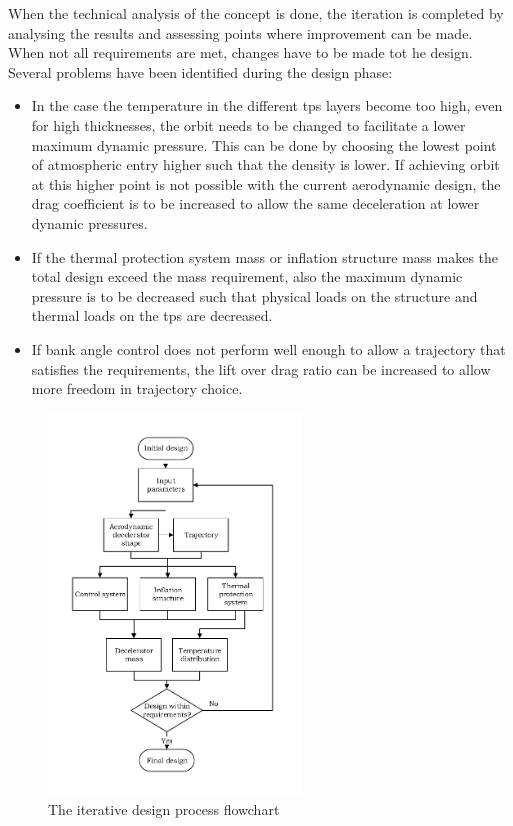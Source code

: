 When the technical analysis of the concept is done, the iteration is completed by analysing the results and assessing points where improvement can be made. When not all requirements are met, changes have to be made tot he design. Several problems have been identified during the design phase:
\begin{itemize}
	\item In the case the temperature in the different \gls{tps} layers become too high, even for high thicknesses, the orbit needs to be changed to facilitate a lower maximum dynamic pressure. This can be done by choosing the lowest point of atmospheric entry higher such that the density is lower. If achieving orbit at this higher point is not possible with the current aerodynamic design, the drag coefficient is to be increased to allow the same deceleration at lower dynamic pressures.
	
	\item If the thermal protection system mass or inflation structure mass makes the total design exceed the mass requirement, also the maximum dynamic pressure is to be decreased such that physical loads on the structure and thermal loads on the \gls{tps} are decreased.
	
	\item If bank angle control does not perform well enough to allow a trajectory that satisfies the requirements, the lift over drag ratio can be increased to allow more freedom in trajectory choice.
	
	
\end{itemize}

\begin{figure}
	\begin{center}
		\includegraphics[width=0.6\textwidth]{./Figure/DesignIterationPhilosophy_new_cropped.pdf}
		\caption{The iterative design process flowchart}
		\label{fig:iterativedesignflowchart}		
	\end{center}
\end{figure}

